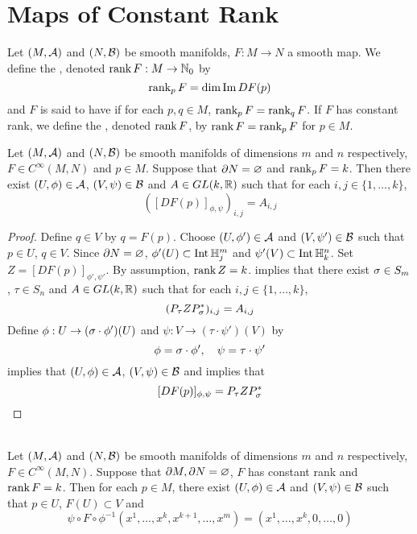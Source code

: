 \documentclass{book}
\begin{document}
	\section{Maps of Constant Rank}
	
	
	\begin{defn} 
		Let $(M, \mathcal{A})$ and $(N, \mathcal{B})$ be smooth manifolds, $F: M \rightarrow N$ a smooth map. We define the , denoted $\operatorname{\text{rank}} F: M \rightarrow \mathbb{N}_0$ by 
		$$\operatorname{\text{rank}}_p F = \dim \text{Im} \, D F(p)$$
		and $F$ is said to have   if for each $p, q \in M$, $\operatorname{\text{rank}}_p F = \operatorname{\text{rank}}_q F$. If $F$ has constant rank, we define the , denoted $\operatorname{\text{rank}} F$, by $\operatorname{\text{rank}} F = \operatorname{\text{rank}}_p F$ for $p \in M$.
	\end{defn}

	\begin{ex} 
		Let $(M, \mathcal{A})$ and $(N, \mathcal{B})$ be smooth manifolds of dimensions $m$ and $n$ respectively, $F \in C^{\infty}(M,N)$ and $p \in M$. Suppose that $\partial N = \varnothing$ and $\operatorname{\text{rank}}_p F = k$. Then there exist $(U, \phi) \in \mathcal{A}$, $(V, \psi) \in \mathcal{B}$ and $A \in GL(k, \mathbb{R})$ such that for each $i,j \in \{1, \ldots, k\}$, 
		$$([DF(p)]_{\phi, \psi})_{i,j} = A_{i,j} $$
	\end{ex}
	
	\begin{proof}
		Define $q \in V$ by $q = F(p)$. Choose $(U, \phi') \in \mathcal{A}$ and $(V, \psi') \in \mathcal{B}$ such that $p \in U$, $q \in V$. Since $\partial N = \varnothing$, $\phi'(U) \subset \operatorname{Int} \mathbb{H}^m_j$ and $\psi'(V) \subset \operatorname{Int} \mathbb{H}^n_k$. Set $Z = [DF(p)]_{\phi', \psi'}$. By assumption, $\operatorname{\text{rank}} Z = k$.  implies that there exist $\sigma \in S_{m}$, $\tau \in S_{n}$ and $A \in GL(k, \mathbb{R})$ such that for each $i,j \in \{1, \ldots, k\}$, 
		$$(P_{\tau} Z P_{\sigma}^*)_{i, j} = A_{i,j}$$
		Define $\phi: U \rightarrow (\sigma \cdot \phi')(U)$ and $\psi: V \rightarrow (\tau \cdot \psi')(V)$ by 
		$$\phi = \sigma \cdot \phi' , \quad \psi = \tau \cdot \psi'$$ 
		 implies that $(U, \phi) \in \mathcal{A}$, $(V, \psi) \in \mathcal{B}$ and  implies that
		$$[DF(p)]_{\phi, \psi} = P_{\tau} Z P_{\sigma}^*$$
	\end{proof}
	
	\begin{ex}   \\ 
			Let $(M, \mathcal{A})$ and $(N, \mathcal{B})$ be smooth manifolds of dimensions $m$ and $n$ respectively, $F \in C^{\infty}(M,N)$. Suppose that $\partial M, \partial N = \varnothing$, $F$ has constant rank and $\operatorname{\text{rank}} F = k$. Then for each $p \in M$, there exist $(U, \phi) \in \mathcal{A}$ and $(V, \psi) \in \mathcal{B}$ such that $p \in U$, $F(U) \subset V$ and
			$$\psi \circ F \circ \phi^{-1}(x^1, \ldots, x^k, x^{k+1}, \ldots, x^m) = (x^1, \ldots, x^k, 0, \ldots, 0)$$ 
			 
	\end{ex}
	
\end{document}
